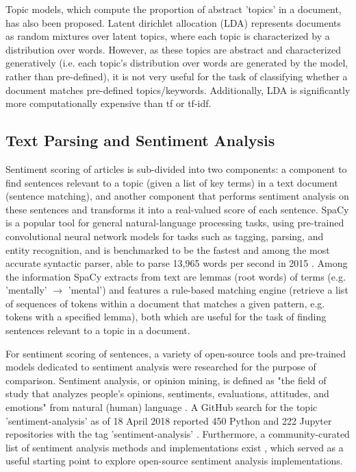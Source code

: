 \documentclass{report}
\begin{document}
Topic models, which compute the proportion of abstract 'topics' in a document, has also been proposed.
Latent dirichlet allocation (LDA) \cite{blei2003latent} represents documents as random mixtures over latent topics, where each topic is characterized by a distribution over words.
However, as these topics are abstract and characterized generatively (i.e. each topic's distribution over words are generated by the model, rather than pre-defined), it is not very useful for the task of classifying whether a document matches pre-defined topics/keywords.
Additionally, LDA is significantly more computationally expensive than tf or tf-idf.

\subsection{Text Parsing and Sentiment Analysis} \label{tc-sentiment}
Sentiment scoring of articles is sub-divided into two components: a component to find sentences relevant to a topic (given a list of key terms) in a text document (sentence matching), and another component that performs sentiment analysis on these sentences and transforms it into a real-valued score of each sentence. 
SpaCy \cite{SpaCy} is a popular tool for general natural-language processing tasks, using pre-trained convolutional neural network models for tasks such as tagging, parsing, and entity recognition, and is benchmarked to be the fastest and among the most accurate syntactic parser, able to parse 13,965 words per second in 2015 \cite{choi2015depends}.
Among the information SpaCy extracts from text are lemmas (root words) of terms (e.g. 'mentally' $\rightarrow$ 'mental') and features a rule-based matching engine (retrieve a list of sequences of tokens within a document that matches a given pattern, e.g. tokens with a specified lemma), both which are useful for the task of finding sentences relevant to a topic in a document.

For sentiment scoring of sentences, a variety of open-source tools and pre-trained models dedicated to sentiment analysis were researched for the purpose of comparison.
Sentiment analysis, or opinion mining, is defined as "the field of study that analyzes people's opinions, sentiments, evaluations, attitudes, and emotions" from natural (human) language \cite{liu2012sentiment}.
A GitHub search for the topic 'sentiment-analysis' as of 18 April 2018 reported 450 Python and 222 Jupyter repositories with the tag 'sentiment-analysis' \cite{GitHub-sentiment-analysis}.
Furthermore, a community-curated list of sentiment analysis methods and implementations exist \cite{awesome-sentiment-analysis}, which served as a useful starting point to explore open-source sentiment analysis implementations.
\end{document}
